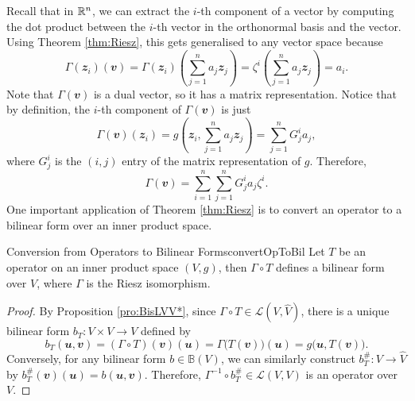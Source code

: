 \documentclass[math, code]{amznotes}
\theoremstyle{remark}
\begin{document}
    Recall that in $\mathbb{R}^n$, we can extract the $i$-th component of a vector by computing the dot product between the $i$-th vector in the orthonormal basis and the vector. Using Theorem \ref{thm:Riesz}, this gets generalised to any vector space because 
    \begin{equation*}
        \Gamma(\mathbfit{z}_i)(\mathbfit{v}) = \Gamma(\mathbfit{z}_i)\left(\sum_{j = 1}^{n}a_j\mathbfit{z}_j\right) = \zeta^i\left(\sum_{j = 1}^{n}a_j\mathbfit{z}_j\right) = a_i.
    \end{equation*}
    Note that $\Gamma(\mathbfit{v})$ is a dual vector, so it has a matrix representation. Notice that by definition, the $i$-th component of $\Gamma(\mathbfit{v})$ is just 
    \begin{equation*}
        \Gamma(\mathbfit{v})(\mathbfit{z}_i) = g\left(\mathbfit{z}_i, \sum_{j = 1}^{n}a_j\mathbfit{z}_j\right) = \sum_{j = 1}^{n}G^i_ja_j,
    \end{equation*}
    where $G^i_j$ is the $(i, j)$ entry of the matrix representation of $g$. Therefore,
    \begin{equation*}
        \Gamma(\mathbfit{v}) = \sum_{i = 1}^{n}\sum_{j = 1}^{n}G^i_ja_j\zeta^i.
    \end{equation*}
    One important application of Theorem \ref{thm:Riesz} is to convert an operator to a bilinear form over an inner product space.
    \begin{probox}{Conversion from Operators to Bilinear Forms}{convertOpToBil}
        Let $T$ be an operator on an inner product space $(V, g)$, then $\Gamma \circ T$ defines a bilinear form over $V$, where $\Gamma$ is the Riesz isomorphism. 
        \tcblower
        \begin{proof}
            By Proposition \ref{pro:BisLVV*}, since $\Gamma \circ T \in \mathcal{L}\left(V, \widehat{V}\right)$, there is a unique bilinear form $b_T \colon V \times V \to V$ defined by 
            \begin{equation*}
                b_T(\mathbfit{u}, \mathbfit{v}) = (\Gamma \circ T)(\mathbfit{v})(\mathbfit{u}) = \Gamma\bigl(T(\mathbfit{v})\bigr)(\mathbfit{u}) = g\bigl(\mathbfit{u}, T(\mathbfit{v})\bigr).
            \end{equation*}
            Conversely, for any bilinear form $b \in \mathbb{B}(V)$, we can similarly construct $b^{\#}_T \colon V \to \widehat{V}$ by $b^{\#}_T(\mathbfit{v})(\mathbfit{u}) = b(\mathbfit{u}, \mathbfit{v})$. Therefore, $\Gamma^{-1} \circ b^{\#}_T \in \mathcal{L}(V, V)$ is an operator over $V$. 
        \end{proof}
    \end{probox}
\end{document}
